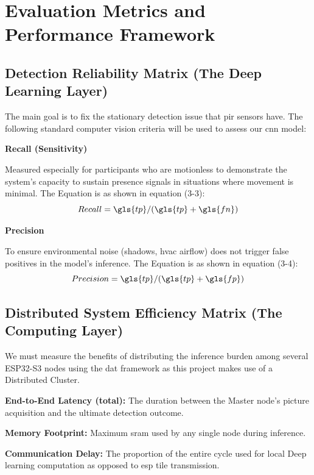 \section{Evaluation Metrics and Performance Framework}
\subsection{Detection Reliability Matrix (The Deep Learning Layer)}

The main goal is to fix the stationary detection issue that \gls{pir} sensors have. The following standard computer vision criteria will be used to assess our \gls{cnn} model:

\textbf{Recall (Sensitivity)}

Measured especially for participants who are motionless to demonstrate the system's capacity to sustain presence signals in situations where movement is minimal. The Equation is as shown in equation (3-3):
\begin{equation}
Recall = \gls{tp} / (\gls{tp}+\gls{fn})
\end{equation}

\textbf{Precision}

To ensure environmental noise (shadows, \gls{hvac} airflow) does not trigger false positives in the model's inference. The Equation is as shown in equation (3-4):
\begin{equation}
Precision = \gls{tp} / (\gls{tp}+\gls{fp})
\end{equation}

\subsection{Distributed System Efficiency Matrix (The Computing Layer)}
We must measure the benefits of distributing the inference burden among several ESP32-S3 nodes using the \gls{dat} framework as this project makes use of a Distributed Cluster.

\textbf{End-to-End Latency (total):} The duration between the Master node's picture acquisition and the ultimate detection outcome.

\textbf{Memory Footprint: } Maximum \gls{sram} used by any single node during inference.

\textbf{Communication Delay:} The proportion of the entire cycle used for local Deep learning computation as opposed to \gls{esp} tile transmission.